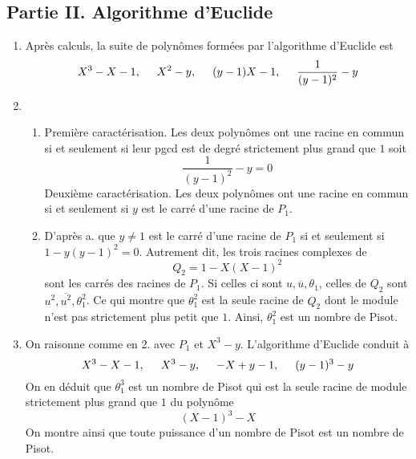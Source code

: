 \subsection*{Partie II. Algorithme d'Euclide}
\begin{enumerate}
 \item Après calculs, la suite de polynômes formées par l'algorithme d'Euclide est
\begin{displaymath}
 X^3-X-1,\hspace{0.5cm} X^2-y,\hspace{0.5cm} (y-1)X-1,\hspace{0.5cm}\frac{1}{(y-1)^2}-y
\end{displaymath}

 \item
\begin{enumerate}
 \item Première caractérisation. Les deux polynômes ont une racine en commun si et seulement si leur pgcd est de degré strictement plus grand que $1$ soit
\begin{displaymath}
 \frac{1}{(y-1)^2}-y=0
\end{displaymath}
 Deuxième caractérisation. Les deux polynômes ont une racine en commun si et seulement si $y$ est le carré d'une racine de $P_1$.

 \item D'après a. que $y\neq1$ est le carré d'une racine de $P_1$ si et seulement si $1-y(y-1)^2=0$. Autrement dit, les trois racines complexes de
\begin{displaymath}
 Q_2 = 1-X(X-1)^2
\end{displaymath}
sont les carrés des racines de $P_1$. Si celles ci sont $u, \overline{u}, \theta_1$, celles de $Q_2$ sont $u^2, \overline{u^2}, \theta_1^2$. Ce qui montre que $\theta_1^2$ est la seule racine de $Q_2$ dont le module n'est pas strictement plus petit que $1$. Ainsi, $\theta_1^2$ est un nombre de Pisot.
\end{enumerate}

 \item On raisonne comme en 2. avec $P_1$ et $X^3-y$. L'algorithme d'Euclide conduit à
\begin{displaymath}
 X^3-X-1,\hspace{0.5cm} X^3-y,\hspace{0.5cm}-X+y-1,\hspace{0.5cm}(y-1)^3-y
\end{displaymath}
On en déduit que $\theta_1^3$ est un nombre de Pisot qui est la seule racine de module strictement plus grand que $1$ du polynôme
\begin{displaymath}
 (X-1)^3-X
\end{displaymath}
On montre ainsi que toute puissance d'un nombre de Pisot est un nombre de Pisot.
\end{enumerate}

